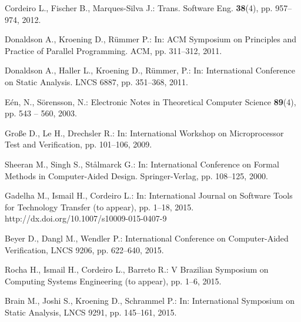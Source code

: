 \documentclass{acm_sen_article}
\begin{document}
\begin{thebibliography}{1}
Cordeiro L., Fischer B., Marques{-}Silva J.:
 Trans. Software Eng. \textbf{38}(4), pp. 957--974, 2012.

Donaldson A., Kroening D., R{\"{u}}mmer P.:
\newblock In: ACM Symposium on Principles and Practice of Parallel Programming. ACM, pp. 311--312, 2011.

Donaldson A., Haller L., Kroening D., R{\"{u}}mmer, P.:
\newblock In: International Conference on Static Analysis. LNCS 6887, pp. 351--368, 2011.

E{\'{e}}n, N., S{\"{o}}rensson, N.:
\newblock Electronic Notes in Theoretical Computer Science \textbf{89}(4), pp. 543 -- 560, 2003.

Gro{\ss}e D., Le H., Drechsler R.:
\newblock In: International Workshop on Microprocessor Test and Verification, pp. 101--106, 2009.

Sheeran M., Singh S., St{\aa}lmarck G.:
\newblock In: International Conference on Formal Methods in Computer-Aided Design. Springer-Verlag, pp. 108--125, 2000.

Gadelha M., Ismail H., Cordeiro L.:
\newblock In: International Journal on Software Tools for Technology Transfer (to appear), pp. 1--18, 2015.
\newblock http://dx.doi.org/10.1007/s10009-015-0407-9

Beyer D., Dangl M., Wendler P.:
\newblock International Conference on Computer-Aided Verification, LNCS 9206, pp. 622--640, 2015.

Rocha H., Ismail H., Cordeiro L., Barreto R.:
\newblock V Brazilian Symposium on Computing Systems Engineering (to appear), pp. 1--6, 2015.

Brain M., Joshi S., Kroening D., Schrammel P.:
\newblock In: International Symposium on Static Analysis, LNCS 9291, pp. 145--161, 2015.


\end{thebibliography}
\end{document}
